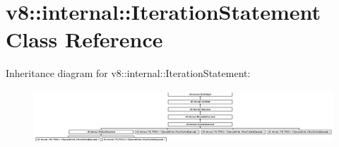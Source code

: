 \hypertarget{classv8_1_1internal_1_1_iteration_statement}{}\section{v8\+:\+:internal\+:\+:Iteration\+Statement Class Reference}
\label{classv8_1_1internal_1_1_iteration_statement}
Inheritance diagram for v8\+:\+:internal\+:\+:Iteration\+Statement\+:\begin{figure}[H]
\begin{center}
\leavevmode
\includegraphics[height=2.000000cm]{classv8_1_1internal_1_1_iteration_statement}
\end{center}
\end{figure}
